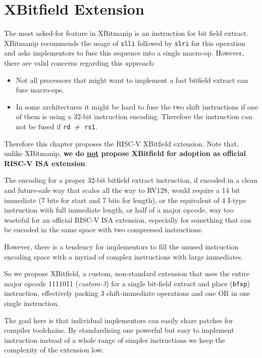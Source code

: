 \chapter{XBitfield Extension}
\label{bfxp}

The most asked-for feature in XBitmanip is an instruction for bit field
extract. XBitmanip recommends the usage of {\tt slli} followed by {\tt slri}
for this operation and asks implementors to fuse this sequence into a single
macro-op. However, there are valid concerns regarding this approach:

\begin{itemize}
\item Not all processors that might want to implement a fast bitfield extract
can fuse macro-ops.
\item In some architectures it might be hard to fuse the two shift instructions
if one of them is using a 32-bit instruction encoding. Therefore the instruction
can not be fused if {\tt rd} $\ne$ {\tt rs1}.
\end{itemize}

Therefore this chapter proposes the RISC-V XBitfield extension. Note that, unlike
XBitmanip, {\bf we do \underline{not} propose XBitfield for adoption as official RISC-V ISA extension}.

The encoding for a proper 32-bit bitfield extract instruction, if encoded
in a clean and future-safe way that scales all the way to RV128, would require
a 14 bit immediate (7 bits for start and 7 bits for length), or the equivalent
of 4 I-type instruction with full immediate length, or half of a major opcode,
way too wasteful for an official RISC-V ISA extension, especially for something
that can be encoded in the same space with two compressed instructions.

However, there is a tendency for implementors to fill the unused instruction
encoding space with a myriad of complex instructions with large immediates.~\cite{Ri5cy}

So we propose XBitfield, a custom, non-standard extension that uses the entire
major opcode 1111011 ({\it custom-3}) for a single bit-field extract and place
({\tt bfxp}) instruction, effectively packing 3 shift-immediate operations and
one OR in one single instruction.

The goal here is that individual implementors can easily share patches for
compiler toolchains. By standardising one powerful but easy to implement
instruction instead of a whole range of simpler instructions we keep the
complexity of the extension low.

